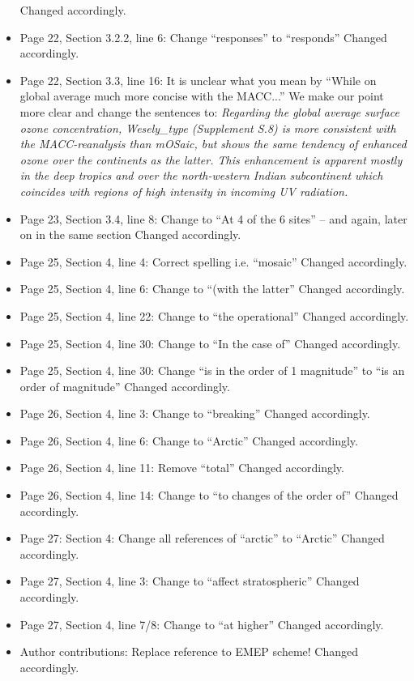 \begin{itemize}
  Changed accordingly.
\item {\color{blue}Page 22, Section 3.2.2, line 6: Change “responses” to “responds”}
  Changed accordingly.
\item {\color{blue}Page 22, Section 3.3, line 16: It is unclear what you mean by “While on global average much more concise with the MACC...”}
  We make our point more clear and change the sentences to: \emph{Regarding the global average surface ozone concentration, \emph{Wesely\_type} (Supplement S.8) is more consistent with the MACC-reanalysis than \emph{mOSaic}, but shows the same tendency of enhanced ozone over the continents as the latter.
This enhancement is apparent mostly in the deep tropics and over the north-western Indian subcontinent which coincides with regions of high intensity in incoming UV radiation.}
\item {\color{blue}Page 23, Section 3.4, line 8: Change to “At 4 of the 6 sites” – and again, later on in the same section}
  Changed accordingly.
\item {\color{blue}Page 25, Section 4, line 4: Correct spelling i.e. “mosaic”}
  Changed accordingly.
\item {\color{blue}Page 25, Section 4, line 6: Change to “(with the latter”}
  Changed accordingly.
\item {\color{blue}Page 25, Section 4, line 22: Change to “the operational”}
  Changed accordingly.
\item {\color{blue}Page 25, Section 4, line 30: Change to “In the case of”}
  Changed accordingly.
\item {\color{blue}Page 25, Section 4, line 30: Change “is in the order of 1 magnitude” to “is an order of magnitude”}
  Changed accordingly.
\item {\color{blue}Page 26, Section 4, line 3: Change to “breaking”}
  Changed accordingly.
\item {\color{blue}Page 26, Section 4, line 6: Change to “Arctic”}
  Changed accordingly.
\item {\color{blue}Page 26, Section 4, line 11: Remove “total”}
  Changed accordingly.
\item {\color{blue}Page 26, Section 4, line 14: Change to “to changes of the order of”}
  Changed accordingly.
\item {\color{blue}Page 27: Section 4: Change all references of “arctic” to “Arctic”}
  Changed accordingly.
\item {\color{blue}Page 27, Section 4, line 3: Change to “affect stratospheric”}
  Changed accordingly.
\item {\color{blue}Page 27, Section 4, line 7/8: Change to “at higher”}
  Changed accordingly.
\item {\color{blue}Author contributions: Replace reference to EMEP scheme!}
  Changed accordingly.
\end{itemize}
\newpage
%

